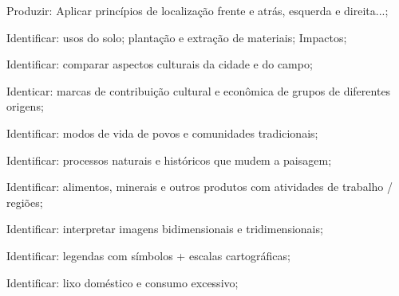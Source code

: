  Produzir: Aplicar princípios de localização  frente e atrás, esquerda e direita...;

 Identificar: usos do solo; plantação e extração de materiais; Impactos;

 Identificar: comparar aspectos culturais da cidade e do campo;

 Identicar:  marcas de contribuição cultural e econômica de grupos de diferentes origens;

 Identificar: modos de vida de povos e comunidades tradicionais;  

 Identificar: processos naturais e históricos que mudem a paisagem;

 Identificar: alimentos, minerais e outros produtos com atividades de trabalho / regiões;

 Identificar: interpretar imagens bidimensionais e tridimensionais;

 Identificar: legendas com símbolos + escalas cartográficas;

 Identificar: lixo doméstico e consumo excessivo;

